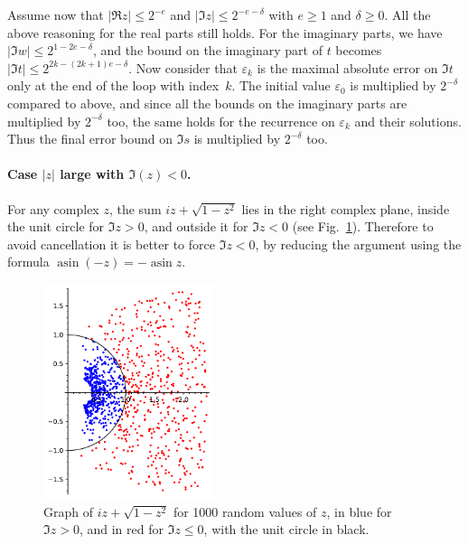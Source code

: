 \documentclass [11pt]{article}
\newcommand {\asin}{\operatorname {asin}}
\renewcommand {\leq}{\leqslant}
\renewcommand {\geq}{\geqslant}
\begin{document}
Assume now that $|\Re z| \leq 2^{-e}$ and $|\Im z| \leq 2^{-e-\delta}$ with
$e \geq 1$ and $\delta \geq 0$. All the above reasoning for the real parts still
holds. For the imaginary parts, we have
$|\Im w| \leq 2^{1-2e-\delta}$, and the bound on the imaginary part of $t$
becomes $|\Im t| \leq 2^{2k-(2k+1)e-\delta}$.
Now consider that $\varepsilon_k$ is the maximal absolute error on
$\Im t$ only at the end of the loop with index~$k$.
The initial value $\varepsilon_0$
is multiplied by $2^{-\delta}$ compared to above,
and since all the bounds on the imaginary
parts are multiplied by $2^{-\delta}$ too, the same holds for the recurrence
on $\varepsilon_k$ and their solutions. Thus the final error bound on
$\Im s$ is multiplied by $2^{-\delta}$ too.

\paragraph{Case $|z|$ large with $\Im(z) < 0$.}
For any complex $z$, the sum $iz + \sqrt{1-z^2}$ lies in the right complex
plane, inside the unit circle for $\Im z > 0$, and outside it for $\Im z < 0$
(see Fig.~\ref{fig_asin}).
Therefore to avoid cancellation it is better to force $\Im z < 0$,
by reducing the argument using the formula $\asin (-z) = - \asin z$.
\begin{figure}[htp]

  \centerline{\includegraphics[width=5cm]{fig_asin.pdf}}
  \caption{Graph of $iz + \sqrt{1-z^2}$ for 1000 random values of $z$,
    in blue for $\Im{z} > 0$, and in red for $\Im{z} \le 0$, with the
    unit circle in black.} \label{fig_asin}
\end{figure}  
\end{document}

